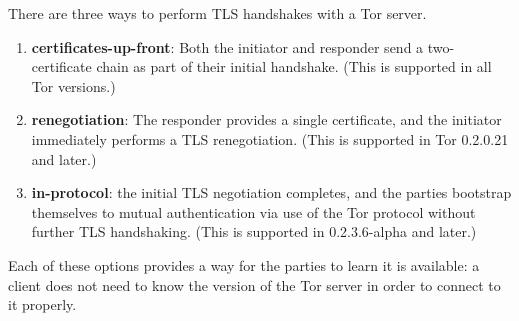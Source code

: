    There are three ways to perform TLS handshakes with a Tor server. 
   
   \begin{enumerate}
   	\item \textbf{certificates-up-front}: Both the initiator and responder send a two-certificate chain as part of their initial handshake.  (This is supported in all Tor versions.)
   	\item \textbf{renegotiation}: The responder provides a single certificate, and the initiator immediately performs a TLS renegotiation. (This is supported in Tor 0.2.0.21 and later.)
   	\item \textbf{in-protocol}: the initial TLS negotiation completes, and the parties bootstrap themselves to mutual authentication via use of the Tor protocol without further TLS handshaking. (This is supported in 0.2.3.6-alpha and later.)
   \end{enumerate}
   
  Each of these options provides a way for the parties to learn it is
   available: a client does not need to know the version of the Tor
   server in order to connect to it properly.
  
  
  
  
  
  
  
  
  
  
  
